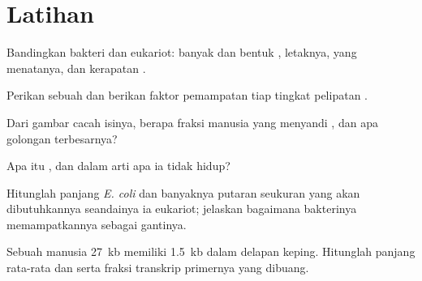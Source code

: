 \section{Latihan}

\begin{exercise}[$\star$]\label{exo:b1:genomes:1}
Bandingkan  bakteri dan  eukariot: banyak dan bentuk
, letaknya,  yang menatanya, dan kerapatan .
\end{exercise}

\begin{exercise}[$\star$]\label{exo:b1:genomes:2}
Perikan sebuah  dan berikan faktor pemampatan tiap tingkat
pelipatan .
\end{exercise}

\begin{exercise}[$\star$]\label{exo:b1:genomes:3}
Dari gambar cacah isinya, berapa fraksi  manusia yang menyandi
, dan apa golongan terbesarnya?
\end{exercise}

\begin{exercise}[$\star$]\label{exo:b1:genomes:4}
Apa itu , dan dalam arti apa ia tidak hidup?
\end{exercise}

\begin{exercise}[$\star\star$]\label{exo:b1:genomes:5}
Hitunglah panjang  \emph{E. coli} dan banyaknya putaran
seukuran  yang akan dibutuhkannya seandainya ia eukariot;
jelaskan bagaimana bakterinya memampatkannya sebagai gantinya.
\end{exercise}

\begin{exercise}[$\star\star$]\label{exo:b1:genomes:6}
Sebuah  manusia \qty{27}{kb} memiliki \qty{1.5}{kb}  dalam
delapan keping. Hitunglah panjang rata-rata  dan  serta
fraksi transkrip primernya yang dibuang.
\end{exercise}

